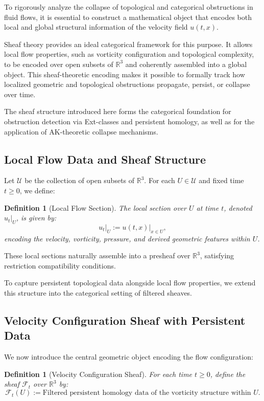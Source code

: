 \documentclass[11pt]{article}
\newtheorem{definition}[theorem]{Definition}
\begin{document}
To rigorously analyze the collapse of topological and categorical obstructions in fluid flows, it is essential to construct a mathematical object that encodes both local and global structural information of the velocity field \( u(t,x) \).

Sheaf theory provides an ideal categorical framework for this purpose. It allows local flow properties, such as vorticity configuration and topological complexity, to be encoded over open subsets of \( \mathbb{R}^3 \) and coherently assembled into a global object. This sheaf-theoretic encoding makes it possible to formally track how localized geometric and topological obstructions propagate, persist, or collapse over time.

The sheaf structure introduced here forms the categorical foundation for obstruction detection via Ext-classes and persistent homology, as well as for the application of AK-theoretic collapse mechanisms.

\subsection{Local Flow Data and Sheaf Structure}

Let \( \mathcal{U} \) be the collection of open subsets of \( \mathbb{R}^3 \). For each \( U \in \mathcal{U} \) and fixed time \( t \geq 0 \), we define:

\begin{definition}[Local Flow Section]
The local section over \( U \) at time \( t \), denoted \( u_t|_U \), is given by:
\[
u_t|_U := \left. u(t,x) \right|_{x \in U},
\]
encoding the velocity, vorticity, pressure, and derived geometric features within \( U \).
\end{definition}

These local sections naturally assemble into a presheaf over \( \mathbb{R}^3 \), satisfying restriction compatibility conditions.

To capture persistent topological data alongside local flow properties, we extend this structure into the categorical setting of filtered sheaves.

\subsection{Velocity Configuration Sheaf with Persistent Data}

We now introduce the central geometric object encoding the flow configuration:

\begin{definition}[Velocity Configuration Sheaf]
For each time \( t \geq 0 \), define the sheaf \( \mathcal{F}_t \) over \( \mathbb{R}^3 \) by:
\[
\mathcal{F}_t(U) := \text{Filtered persistent homology data of the vorticity structure within } U.
\]
\end{definition}
\end{document}
